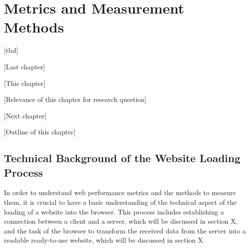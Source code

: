 \chapter{Metrics and Measurement Methods}

[tbd]


[Last chapter]



[This chapter]





[Relevance of this chapter for research question]





[Next chapter]





[Outline of this chapter]










\section{Technical Background of the Website Loading Process}



In order to understand web performance metrics and the methods to measure them, it is crucial to have a basic understanding of the technical aspect of the loading of a website into the browser.
This process includes establishing a connection between a client and a server, which will be discussed in section X, and the task of the browser to transform the received data from the server into a readable ready-to-use website, which will be discussed in section X.


